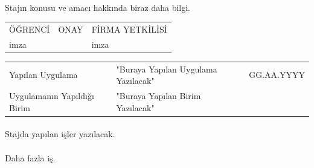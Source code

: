 \documentclass[12pt,a4paper]{report}
\begin{document}
\paragraph{} Stajın konusu ve amacı hakkında biraz daha bilgi.
\mbox{}
\vfill
\begin{center}
\begin{tabular}{|>{\centering}m{3.6cm}|>{\centering}m{7.4cm}|>{\centering}m{4cm}|}
ÖĞRENCİ&ONAY&FİRMA YETKİLİSİ
\tabularnewline
imza &&imza
\end{tabular}
\end{center}


\newpage %
 
\begin{center}
\begin{tabular}{llr}
\parbox[c]{5cm}{Yapılan Uygulama}
&\parbox[c]{8cm}{"Buraya Yapılan Uygulama Yazılacak"} %
&\parbox[c]{3cm}{GG.AA.YYYY}%
\\
\parbox[c]{5cm}{Uygulamanın Yapıldığı Birim}
&\parbox[c]{8cm}{"Buraya Yapılan Birim Yazılacak"} %
\end{tabular}
\end{center}

\paragraph{} Stajda yapılan işler yazılacak.
\paragraph{} Daha fazla iş.
\end{document}
